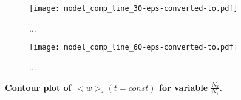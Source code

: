 \documentclass[a4paper,10pt]{article}
\begin{document}
  \begin{figure}[h!]
  \centering
    \texttt{[image: model\_comp\_line\_30-eps-converted-to.pdf]}
  \label{model_comp_late}
  \caption{ ... }
  \end{figure}
  
   \begin{figure}[h!]
  \centering
    \texttt{[image: model\_comp\_line\_60-eps-converted-to.pdf]}
  \label{model_comp_late}
  \caption{ ... }
  \end{figure}

{\bf Contour plot of $<w>_z(t=const)$ for variable $\frac{N_2}{N_1}$. }


\FloatBarrier




%
%
%
\end{document}
